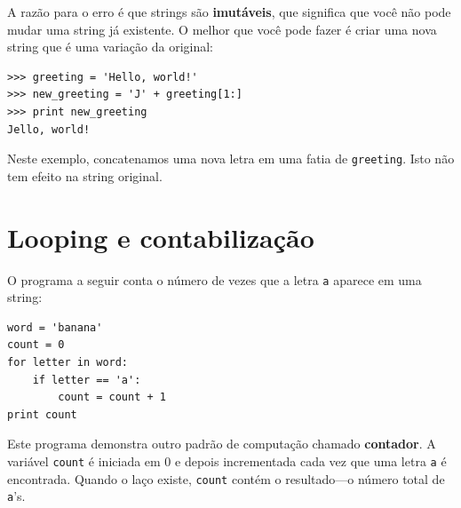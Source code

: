 {%


A razão para o erro é que strings são {\bf imutáveis}, que significa que você
não pode mudar uma string já existente. O melhor que você pode fazer é criar
uma nova string que é uma variação da original:

\beforeverb
\begin{verbatim}
>>> greeting = 'Hello, world!'
>>> new_greeting = 'J' + greeting[1:]
>>> print new_greeting
Jello, world!
\end{verbatim}
\afterverb
%
%
Neste exemplo, concatenamos uma nova letra em uma fatia de {\tt greeting}.
Isto não tem efeito na string original.


\section{Looping e contabilização}
\label{contador}





O programa a seguir conta o número de vezes que a letra {\tt a} aparece em
uma string:

\beforeverb
\begin{verbatim}
word = 'banana'
count = 0
for letter in word:
    if letter == 'a':
        count = count + 1
print count
\end{verbatim}
\afterverb
%
%
Este programa demonstra outro padrão de computação chamado {\bf contador}. A
variável {\tt count} é iniciada em 0 e depois incrementada cada vez que uma
letra {\tt a} é encontrada. Quando o laço existe, {\tt count} contém o
resultado---o número total de {\tt a}'s.

}
